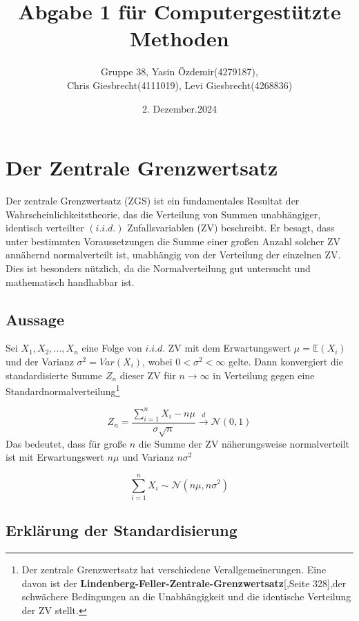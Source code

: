 \documentclass{article}
\title{Abgabe 1 für Computergestützte Methoden}
\author{Gruppe 38, Yasin Özdemir(4279187), \\Chris Giesbrecht(4111019), Levi Giesbrecht(4268836)}
\date{2. Dezember.2024}
\begin{document}
\maketitle
\tableofcontents
\newpage

\section{Der Zentrale Grenzwertsatz}
Der zentrale Grenzwertsatz (ZGS) ist ein fundamentales Resultat der Wahrscheinlichkeitstheorie, das die Verteilung von Summen unabhängiger, identisch verteilter $(i.i.d.)$ Zufallsvariablen (ZV) beschreibt. Er besagt, dass unter bestimmten Voraussetzungen die Summe einer großen Anzahl  solcher ZV annähernd normalverteilt ist, unabhängig von der Verteilung der einzelnen ZV. Dies ist besonders nützlich, da die Normalverteilung gut untersucht und mathematisch handhabbar ist.



\subsection{Aussage}
Sei $X_1, X_2, . . . , X_n$ eine Folge von $i.i.d.$ ZV mit dem Erwartungswert $\mu =\mathbb{E}(X_i)$ und der Varianz $\sigma^2 = Var(X_i)$, wobei  $0<\sigma^2<\infty$  gelte. Dann konvergiert die standardisierte Summe $Z_n$ dieser ZV für $n\rightarrow\infty$ in Verteilung gegen eine Standardnormalverteilung\footnote{Der zentrale Grenzwertsatz hat verschiedene Verallgemeinerungen. Eine davon ist der \textbf{Lindenberg-Feller-Zentrale-Grenzwertsatz}[\cite{AchimKlenke},Seite 328],der schwächere Bedingungen an die Unabhängigkeit und die identische Verteilung der ZV stellt.}

\begin{equation}
\label{eq:ZGS}    
Z_n=\frac{\sum\nolimits_{i=1}^n X_i-n\mu}{\sigma\sqrt{n}}\xrightarrow{d} \mathcal{N}(0,1)
\end{equation}
Das bedeutet, dass für große $n$ die Summe der ZV näherungsweise normalverteilt ist mit Erwartungswert $n\mu$ und Varianz $n\sigma^2$

\begin{equation}
\label{eq:ZGSs}
\sum_{i=1}^{n}X_i\sim \mathcal{N}(n\mu,n\sigma^2)
\end{equation}

\subsection{Erklärung der Standardisierung}
\end{document}
